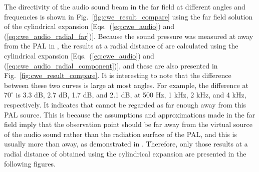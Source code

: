 The directivity of the audio sound beam in the far field at different angles and frequencies is shown in Fig.~\ref{fig:cwe_result_compare} using the far field solution of the cylindrical expansion [Eqs.~(\ref{eq:cwe_audio}) and (\ref{eq:cwe_audio_radial_far})]. 
Because the sound pressure was measured at  away from the PAL in \cite{Shi2015ConvolutionModelComputing}, the results at a radial distance of  are calculated using the cylindrical expansion [Eqs.~(\ref{eq:cwe_audio}) and (\ref{eq:cwe_audio_radial_component})], and these are also presented in Fig.~\ref{fig:cwe_result_compare}. 
It is interesting to note that the difference between these two curves is large at most angles. 
For example, the difference at $70^\circ$ is 3.3 dB, 2.7 dB, 1.7 dB, and 2.1 dB, at 500 Hz, 1 kHz, 2 kHz, and 4 kHz, respectively. 
It indicates that  cannot be regarded as far enough away from this PAL source. 
This is because the assumptions and approximations made in the far field imply that the observation point should be far away from the virtual source of the audio sound rather than the radiation surface of the PAL, and this is usually more than  away, as demonstrated in \cite{Zhong2021FieldWesterveltFar}. 
Therefore, only those results at a radial distance of  obtained using the cylindrical expansion are presented in the following figures. 

